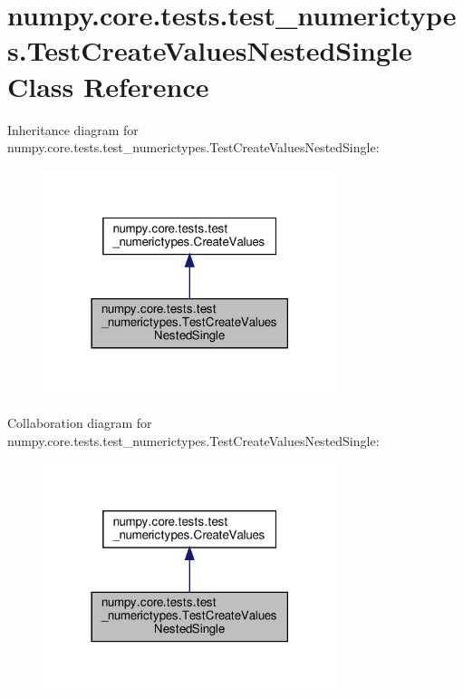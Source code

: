 \hypertarget{classnumpy_1_1core_1_1tests_1_1test__numerictypes_1_1TestCreateValuesNestedSingle}{}\section{numpy.\+core.\+tests.\+test\+\_\+numerictypes.\+Test\+Create\+Values\+Nested\+Single Class Reference}
\label{classnumpy_1_1core_1_1tests_1_1test__numerictypes_1_1TestCreateValuesNestedSingle}


Inheritance diagram for numpy.\+core.\+tests.\+test\+\_\+numerictypes.\+Test\+Create\+Values\+Nested\+Single\+:
\nopagebreak
\begin{figure}[H]
\begin{center}
\leavevmode
\includegraphics[width=242pt]{classnumpy_1_1core_1_1tests_1_1test__numerictypes_1_1TestCreateValuesNestedSingle__inherit__graph}
\end{center}
\end{figure}


Collaboration diagram for numpy.\+core.\+tests.\+test\+\_\+numerictypes.\+Test\+Create\+Values\+Nested\+Single\+:
\nopagebreak
\begin{figure}[H]
\begin{center}
\leavevmode
\includegraphics[width=242pt]{classnumpy_1_1core_1_1tests_1_1test__numerictypes_1_1TestCreateValuesNestedSingle__coll__graph}
\end{center}
\end{figure}
